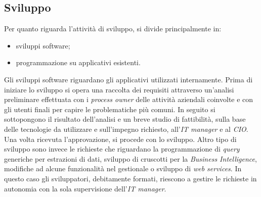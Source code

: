 
\subsection{Sviluppo}

Per quanto riguarda l'attività di sviluppo, si divide principalmente in: 
\begin{itemize}
	\item sviluppi software; 
	\item programmazione su applicativi esistenti.
\end{itemize}
Gli sviluppi software riguardano gli applicativi utilizzati internamente. Prima di iniziare lo sviluppo si opera una raccolta dei requisiti attraverso un'analisi preliminare effettuata con i \textit{process owner} delle attività aziendali coinvolte e con gli utenti finali per capire le problematiche più comuni. In seguito si sottopongono il risultato dell'analisi e un breve studio di fattibilità, sulla base delle tecnologie da utilizzare e sull'impegno richiesto, all'\textit{IT manager} e al \textit{CIO}. Una volta ricevuta l'approvazione, si procede con lo sviluppo. 
Altro tipo di sviluppo sono invece le richieste che riguardano la programmazione di \textit{query} generiche per estrazioni di dati, sviluppo di cruscotti per la \textit{Business Intelligence}, modifiche ad alcune funzionalità nel gestionale o sviluppo di \textit{web services}. In questo caso gli sviluppatori, debitamente formati, riescono a gestire le richieste in autonomia con la sola supervisione dell'\textit{IT manager}.



